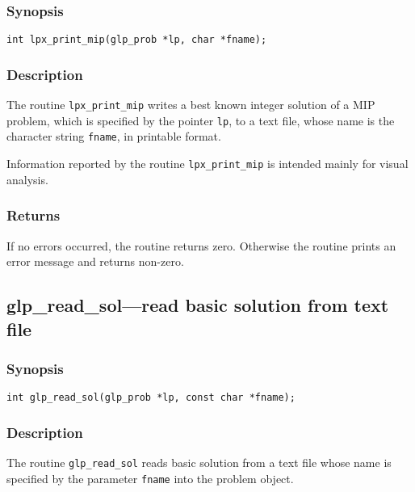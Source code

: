 \subsubsection*{Synopsis}

\begin{verbatim}
int lpx_print_mip(glp_prob *lp, char *fname);
\end{verbatim}

\subsubsection*{Description}

The routine \verb|lpx_print_mip| writes a best known integer solution
of a MIP problem, which is specified by the pointer \verb|lp|, to a text
file, whose name is the character string \verb|fname|, in printable
format.

Information reported by the routine \verb|lpx_print_mip| is intended
mainly for visual analysis.

\subsubsection*{Returns}

If no errors occurred, the routine returns zero. Otherwise the routine
prints an error message and returns non-zero.

\pagebreak

\subsection{glp\_read\_sol---read basic solution from text file}

\subsubsection*{Synopsis}

\begin{verbatim}
int glp_read_sol(glp_prob *lp, const char *fname);
\end{verbatim}

\subsubsection*{Description}

The routine \verb|glp_read_sol| reads basic solution from a text file
whose name is specified by the parameter \verb|fname| into the problem
object.


